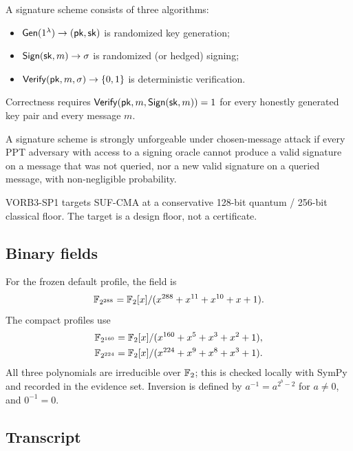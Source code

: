 \documentclass[11pt,a4paper]{article}
\begin{document}
\begin{definition}
A signature scheme consists of three algorithms:
\begin{itemize}
  \item $\mathsf{Gen}(1^\lambda)\to(\mathsf{pk},\mathsf{sk})$ is randomized key generation;
  \item $\mathsf{Sign}(\mathsf{sk},m)\to\sigma$ is randomized (or hedged) signing;
  \item $\mathsf{Verify}(\mathsf{pk},m,\sigma)\to\{0,1\}$ is deterministic verification.
\end{itemize}
Correctness requires $\mathsf{Verify}(\mathsf{pk},m,\mathsf{Sign}(\mathsf{sk},m))=1$ for every honestly
generated key pair and every message $m$.
\end{definition}

\begin{definition}
A signature scheme is strongly unforgeable under chosen-message attack if
every PPT adversary with access to a signing oracle cannot produce a valid
signature on a message that was not queried, nor a new valid signature on a
queried message, with non-negligible probability.
\end{definition}

VORB3-SP1 targets SUF-CMA at a conservative 128-bit quantum / 256-bit
classical floor. The target is a design floor, not a certificate.

\subsection{Binary fields}

For the frozen default profile, the field is
\[
\mathbb{F}_{2^{288}}=\mathbb{F}_2[x]/(x^{288}+x^{11}+x^{10}+x+1).
\]
The compact profiles use
\begin{align*}
\mathbb{F}_{2^{160}}&=\mathbb{F}_2[x]/(x^{160}+x^5+x^3+x^2+1),\\
\mathbb{F}_{2^{224}}&=\mathbb{F}_2[x]/(x^{224}+x^9+x^8+x^3+1).
\end{align*}
All three polynomials are irreducible over $\mathbb{F}_2$; this is checked locally
with SymPy and recorded in the evidence set. Inversion is defined by
$a^{-1}=a^{2^b-2}$ for $a\ne0$, and $0^{-1}=0$.

\subsection{Transcript}
\end{document}
